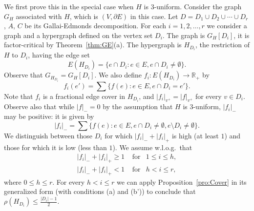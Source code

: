 \documentclass[10pt,a4paper]{amsart}
\begin{document}
We first prove this in the special case when $H$ is $3$-uniform. Consider the graph $G_H$ associated with $H$, which is $(V, \partial E)$ in this case. Let $D = D_1 \cup D_2 \cup \cdots \cup D_r$, $A$, $C$ be its Gallai-Edmonds decomposition. For each $i=1,2, \ldots , r$ we consider a graph and a hypergraph defined on the vertex set $D_i$. The graph is $G_H[D_i]$, it is factor-critical by Theorem~\ref{thm:GE}(a). The hypergraph is $H_{D_i}$, the restriction of $H$ to $D_i$, having the edge set
\begin{equation} \label{eq:rest}
E(H_{D_i}) = \{ e \cap D_i: e \in E, e\cap D_i \ne \emptyset\}.
\end{equation}
Observe that $G_{H_{D_i}} = G_H[D_i]$. We also define $f_i: E(H_{D_i}) \to \mathbb{R}_+$ by
\begin{equation} \label{eq:frest}
f_i(e') = \sum \{f(e): e \in E, e \cap D_i = e'\}.
\end{equation}
Note that $f_i$ is a fractional edge cover in $H_{D_i}$, and $|f_i|_{v^+} = |f|_{v^+}$ for every $v \in D_i$. Observe also that while $|f|_- = 0$ by the assumption that $H$ is $3$-uniform, $|f_i|_-$ may be positive: it is given by
\begin{equation} \label{eq:minus}
|f_i|_- = \sum \{ f(e): e \in E, e \cap D_i \ne \emptyset ,e \setminus D_i \ne \emptyset \}.
\end{equation}
We distinguish between those $D_i$ for which $|f_i|_- + |f_i|_+$ is high (at least $1$) and those for which it is low (less than $1$). We assume w.l.o.g.\ that
\begin{eqnarray*}
|f_i|_- + |f_i|_+ \ge 1\,\, & \textrm{for} & 1 \le i \le h, \\
|f_i|_- + |f_i|_+ < 1\,\, & \textrm{for} & h < i \le r,
\end{eqnarray*}
where $0 \le h \le r$. For every $h < i \le r$ we can apply Proposition~\ref{pro:Cover} in its generalized form (with conditions (a) and (b')) to conclude that $\rho(H_{D_i}) \le \frac{|D_i|-1}{2}$.
\end{document}
